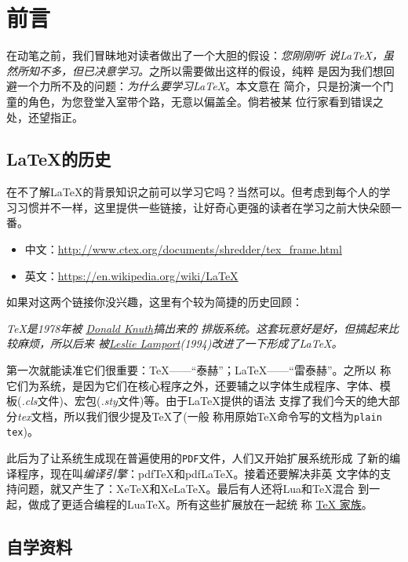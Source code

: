 \section{前言}

在动笔之前，我们冒昧地对读者做出了一个大胆的假设：\emph{您刚刚听
  说\LaTeX{}，虽然所知不多，但已决意学习。}之所以需要做出这样的假设，纯粹
是因为我们想回避一个力所不及的问题：\emph{为什么要学习\LaTeX{}}。本文意在
简介，只是扮演一个门童的角色，为您登堂入室带个路，无意以偏盖全。倘若被某
位行家看到错误之处，还望指正。

\subsection{\LaTeX{}的历史}

在不了解\LaTeX{}的背景知识之前可以学习它吗？当然可以。但考虑到每个人的学
习习惯并不一样，这里提供一些链接，让好奇心更强的读者在学习之前大快朵颐一
番。

\begin{itemize}
\item 中文：\url{http://www.ctex.org/documents/shredder/tex_frame.html}
\item 英文：\url{https://en.wikipedia.org/wiki/LaTeX}
\end{itemize}

如果对这两个链接你没兴趣，这里有个较为简捷的历史回顾：

\emph{
  \TeX{}是1978年被
  \href{https://en.wikipedia.org/wiki/Donald_Knuth}{Donald Knuth}搞出来的
  排版系统。这套玩意好是好，但搞起来比较麻烦，所以后来
  被\href{https://en.wikipedia.org/wiki/Leslie_Lamport}{Leslie
    Lamport}(1994)改进了一下形成了\LaTeX{}。}

第一次就能读准它们很重要：\TeX{}——“泰赫”；\LaTeX{}——“雷泰赫”。之所以
称它们为系统，是因为它们在核心程序之外，还要辅之以字体生成程序、字体、模
板(\textit{.cls}文件)、宏包(\textit{.sty}文件)等。由于\LaTeX{}提供的语法
支撑了我们今天的绝大部分\textit{tex}文档，所以我们很少提及\TeX{}了(一般
称用原始\TeX{}命令写的文档为\texttt{plain tex})。

此后为了让系统生成现在普遍使用的\texttt{PDF}文件，人们又开始扩展系统形成
了新的编译程序，现在叫\emph{编译引擎}：pdfTeX和pdfLaTeX。接着还要解决非英
文字体的支持问题，就又产生了：XeTeX和XeLaTeX。最后有人还将Lua和\TeX{}混合
到一起，做成了更适合编程的LuaTeX。所有这些扩展放在一起统
称
\href{https://www.sharelatex.com/blog/2012/12/01/the-tex-family-tree-latex-pdftex-xelatex-luatex-context.html}{\TeX{}
  家族}。

\subsection{自学资料}

